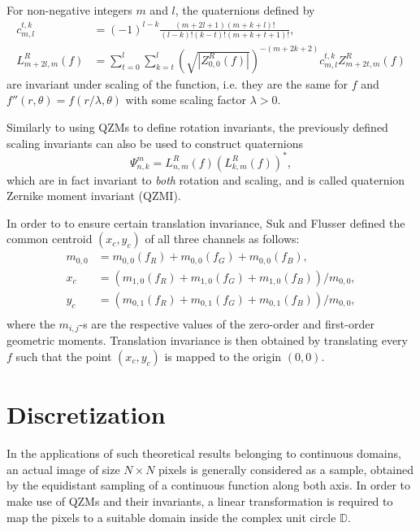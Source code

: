 \documentclass[12pt]{article}
\newcommand{\D}{\mathbb{D}}
\begin{document}
For non-negative integers $m$ and $l$, the quaternions defined by
\[
  \begin{split}
  c_{m,l}^{t,k} &= (-1)^{l-k}\frac{(m + 2l + 1)(m + k + l)!}{(l - k)!(k - t)!(m + k + t + 1)!}, \\
  L_{m + 2l,m}^R(f) &= \sum_{t=0}^l\sum_{k=t}^l\left(\sqrt{|Z_{0,0}^R(f)|}\right)^{-(m+2k+2)}c_{m,l}^{t,k}Z_{m+2t,m}^R(f)
  \end{split}
\]
are invariant under scaling of the function, i.e. they are the same for $f$ and $f'' (r,\theta) = f(r/\lambda,\theta)$ with some scaling factor $\lambda>0$.

Similarly to using QZMs to define rotation invariants, the previously defined scaling invariants can also be used to construct quaternions $$\Psi_{n,k}^m = L_{n,m}^R(f)(L_{k,m}^R(f))^*,$$ which are in fact invariant to \textit{both} rotation and scaling, and is called quaternion Zernike moment invariant (QZMI).

In order to to ensure certain translation invariance, Suk and Flusser \cite{SukFlusser} defined the common centroid $(x_c, y_c)$ of all three channels as follows:
\[
\begin{split}
	m_{0,0} &= m_{0,0}(f_R)+m_{0,0}(f_G)+m_{0,0}(f_B), \\
	x_c &= \left( m_{1,0}(f_R)+m_{1,0}(f_G)+m_{1,0}(f_B) \right) / m_{0,0}, \\
	y_c &= \left( m_{0,1}(f_R)+m_{0,1}(f_G)+m_{0,1}(f_B) \right) / m_{0,0}, \\
\end{split}
\]
where the $m_{i,j}$-s are the respective values of the zero-order and first-order geometric moments. Translation invariance is then obtained by translating every $f$ such that the point $(x_c,y_c)$ is mapped to the origin $(0,0)$.

\section{Discretization}

In the applications of such theoretical results belonging to continuous domains, an actual image of size $N\times N$ pixels is generally considered as a sample, obtained by the equidistant sampling of a continuous function along both axis. In order to make use of QZMs and their invariants, a linear transformation is required to map the pixels to a suitable domain inside the complex unit circle $\D$.
\end{document}

